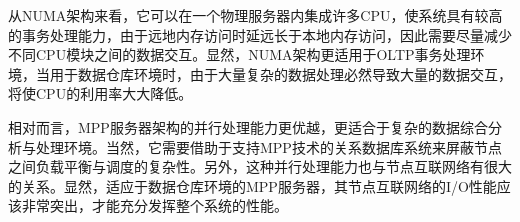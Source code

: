 从NUMA架构来看，它可以在一个物理服务器内集成许多CPU，使系统具有较高的事务处理能力，由于远地内存访问时延远长于本地内存访问，因此需要尽量减少不同CPU模块之间的数据交互。显然，NUMA架构更适用于OLTP事务处理环境，当用于数据仓库环境时，由于大量复杂的数据处理必然导致大量的数据交互，将使CPU的利用率大大降低。

相对而言，MPP服务器架构的并行处理能力更优越，更适合于复杂的数据综合分析与处理环境。当然，它需要借助于支持MPP技术的关系数据库系统来屏蔽节点之间负载平衡与调度的复杂性。另外，这种并行处理能力也与节点互联网络有很大的关系。显然，适应于数据仓库环境的MPP服务器，其节点互联网络的I/O性能应该非常突出，才能充分发挥整个系统的性能。 









